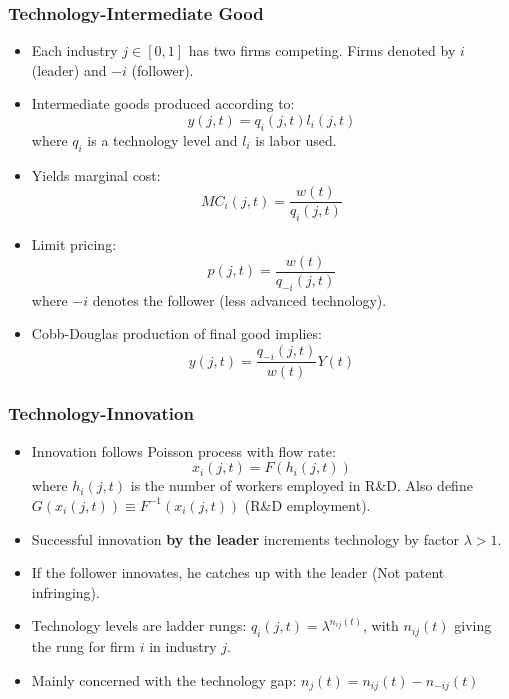 \documentclass{beamer}
\begin{document}
\begin{frame}[t]\frametitle{Technology-Intermediate Good} 
  \begin{itemize}
    \item<+-> Each industry $j \in [0, 1]$ has two firms competing. Firms denoted by $i$ (leader) and $-i$ (follower).

    \item<+-> Intermediate goods produced according to:
      \begin{equation*} \label{eq:intermediate_production}
        y(j, t) = q_i(j, t)l_i(j, t)
      \end{equation*}
      where $q_i$ is a technology level and $l_i$ is labor used. 

    \item<+-> Yields marginal cost:
      \begin{equation*} \label{eq:marginal_cost}
        MC_i(j, t) = \frac{w(t)}{q_i(j, t)}
      \end{equation*}

    \item<+-> Limit pricing:
      \begin{equation*} \label{eq:limit_pricing}
        p(j, t) = \frac{w(t)}{q_{-i}(j, t)}      
      \end{equation*}
    where $-i$ denotes the follower (less advanced technology).
    \item<+-> Cobb-Douglas production of final good implies:
      \begin{equation*}
        y(j, t) = \frac{q_{-i}(j, t)}{w(t)}Y(t)
      \end{equation*}
  \end{itemize}
\end{frame}

\begin{frame}[t]\frametitle{Technology-Innovation} 
  \begin{itemize}
    \item<+-> Innovation follows Poisson process with flow rate:
      \begin{equation*} \label{eq:tech_rd_technology}
        x_i(j, t) = F(h_i(j, t))
      \end{equation*}
      where $h_i(j, t)$ is the number of workers employed in R\&D.
      Also define $G(x_i(j,t)) \equiv F^{-1}(x_i(j,t))$ (R\&D employment).
    \item<+-> Successful innovation \textbf{by the leader} increments technology by factor $\lambda > 1$.
    \item<+-> If the follower innovates, he catches up with the leader (Not patent infringing).
    \item<+-> Technology levels are ladder rungs: $q_i(j, t) = \lambda^{n_{ij}(t)}$, with $n_{ij}(t)$ giving the rung for firm $i$ in industry $j$.
    \item<+-> Mainly concerned with the technology gap: $n_j(t) = n_{ij}(t) - n_{-ij}(t)$
  \end{itemize}
\end{frame}
\end{document}
